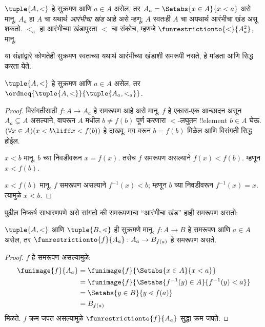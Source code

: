 \documentclass[../../../include/open-logic-section]{subfiles}
\begin{document}
\begin{defn}
$\tuple{A, <}$ हे सुक्रमण आणि $a \in A$ असेल, तर $A_a = \Setabs{x \in A}{x
< a}$ असे मानू. $A_a$ हा $A$ चा यथार्थ \emph{आरंभीचा खंड} आहे असे म्हणू; $A$ स्वतःही $A$ चा अयथार्थ आरंभीचा खंड असू शकतो. $<_a$ हा आरंभीच्या खंडापुरता $<$ चा संकोच, म्हणजे $\funrestrictionto{\mathord{<}}{A_a^2}$, मानू.
\end{defn}
\noindent
या संज्ञांद्वारे कोणतेही सुक्रमण स्वतःच्या यथार्थ आरंभीच्या खंडाशी समरूपी नसते, हे मांडता आणि सिद्ध करता येते.

\begin{lem}
$\tuple{A, <}$ हे सुक्रमण आणि $a \in A$ असेल, तर
$\ordneq{\tuple{A, <}}{\tuple{A_a, <_a}}$.
\end{lem}

\begin{proof}
विसंगतीसाठी $f \colon A \to A_a$ हे समरूपण आहे असे मानू. $f$ हे एकास-एक आच्छादन असून $A_a \subsetneq A$ असल्याने,  वापरून $A$ मधील $b \neq f(b)$ पूर्ण करणारा $<$-लघुतम !!{element} $b \in A$ घेऊ. $(\forall x \in A)(x<b \liff x < f(b))$ हे दाखवू. मग  वरून $b = f(b)$ मिळेल आणि विसंगती सिद्ध होईल.

$x < b$ मानू. $b$ च्या निवडीवरून $x = f(x)$. तसेच $f$ समरूपण असल्याने $f(x) < f(b)$. म्हणून $x < f(b)$.

$x < f(b)$ मानू. $f$ समरूपण असल्याने $f^{-1}(x) < b$; म्हणून $b$ च्या निवडीवरून $f^{-1}(x) = x$. त्यामुळे $x < b$.
\end{proof}

पुढील निष्कर्ष साधारणपणे असे सांगतो की समरूपणाचा ``आरंभीचा खंड'' हाही समरूपण असतो:

\begin{lem}
$\tuple{A, <}$ आणि $\tuple{B, \lessdot}$ ही सुक्रमणे मानू. $f
\colon A \to B$ हे समरूपण आणि $a \in A$ असेल, तर
$\funrestrictionto{f}{A_{a}} : A_a \to B_{f(a)}$ हे समरूपण असते.
\end{lem}

\begin{proof}
$f$ हे समरूपण असल्यामुळे:
\begin{align*}
	\funimage{f}{A_a} &= \funimage{f}{\Setabs{x \in A}{x < a}}\\
	&= \funimage{f}{\Setabs{f^{-1}(y) \in A}{f^{-1}(y) < a}} \\
	&= \Setabs{y \in B}{y \lessdot f(a)} \\
	&=B_{f(a)}
\end{align*}
मिळते. $f$ क्रम जपत असल्यामुळे $\funrestrictionto{f}{A_a}$ सुद्धा क्रम जपते.
\end{proof}
\end{document}

